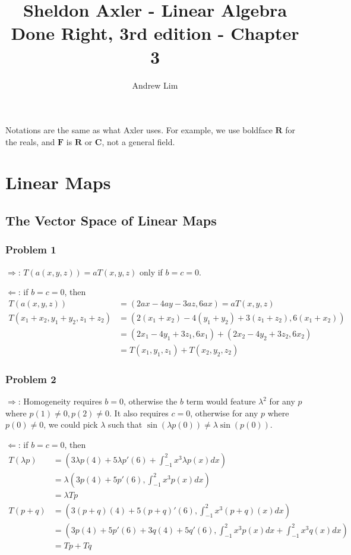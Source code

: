 \documentclass{article}
\begin{document}
\title{Sheldon Axler - Linear Algebra Done Right, 3rd edition - Chapter 3}
\author{Andrew Lim}

\def \problem#1{\subsubsection*{Problem #1}}
\def \real{\mathbf{R}}
\def \complex{\mathbf{C}}
\def \field{\mathbf{F}}

Notations are the same as what Axler uses. For example, we use boldface $\real$
for the reals, and $\field$ is $\real$ or $\complex$, not a general field.

\section{Linear Maps}

\subsection{The Vector Space of Linear Maps}

\problem{1}

$\Rightarrow$: $T(a(x,y,z)) = aT(x,y,z)$ only if $b = c = 0$.

$\Leftarrow$: if $b = c = 0$, then
\begin{align*}
  T(a(x,y,z)) & = (2ax - 4ay - 3az, 6ax) = aT(x,y,z) \\
  T(x_1 + x_2, y_1 + y_2, z_1 + z_2) & = (2(x_1 + x_2) - 4(y_1 + y_2) + 3(z_1 +
                                       z_2), 6(x_1 + x_2)) \\
              & = (2x_1 - 4y_1 + 3z_1, 6x_1) + (2x_2 - 4y_2 + 3z_2, 6x_2) \\
              & = T(x_1, y_1, z_1) + T(x_2, y_2, z_2)
\end{align*}

\problem{2}

$\Rightarrow$: Homogeneity requires $b = 0$, otherwise the $b$ term would
feature $\lambda^2$ for any $p$ where $p(1) \neq 0, p(2) \neq 0$. It also
requires $c = 0$, otherwise for any $p$ where $p(0) \neq 0$, we could pick
$\lambda$ such that $\sin (\lambda p(0)) \neq \lambda \sin (p(0))$.

$\Leftarrow$: if $b = c = 0$, then
\begin{align*}
  T(\lambda p) & = (3 \lambda p(4) + 5 \lambda p'(6) + \int_{-1}^2 x^3 \lambda p(x) dx) \\
               & = \lambda (3p(4) + 5p'(6), \int_{-1}^2 x^3 p(x) dx) \\
               & = \lambda Tp \\
  T(p + q) & = (3(p+q)(4) + 5(p+q)'(6), \int_{-1}^2 x^3(p+q)(x) dx) \\
               & = (3p(4) + 5p'(6) + 3q(4) + 5q'(6), \int_{-1}^2 x^3p(x) dx + \int_{-1}^2 x^3q(x) dx) \\
               & = Tp + Tq
\end{align*}
\end{document}
